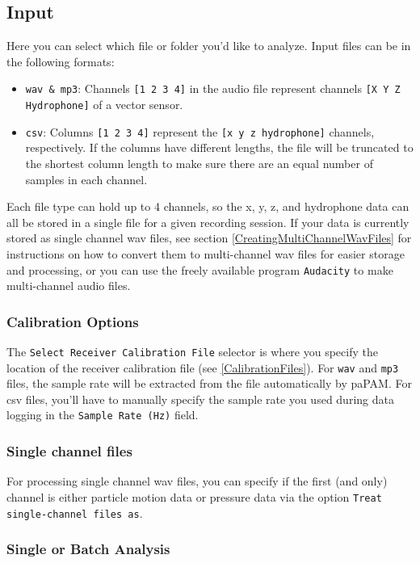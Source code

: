 \documentclass[11pt]{report}
\begin{document}
\subsection{Input}
Here you can select which file or folder you'd like to analyze.  Input files can be in the following formats:

\begin{itemize}
\item \texttt{wav \& mp3}: Channels \texttt{[1 2 3 4]} in the audio file represent channels \texttt{[X Y Z Hydrophone]} of a vector sensor.

\item \texttt{csv}: Columns \texttt{[1 2 3 4]} represent the \texttt{[x y z hydrophone]} channels, respectively.  If the columns have different lengths, the file will be truncated to the shortest column length to make sure there are an equal number of samples in each channel.
\end{itemize}

Each file type can hold up to 4 channels, so the x, y, z, and hydrophone data can all be stored in a single file for a given recording session.  If your data is currently stored as single channel wav files, see section \ref{CreatingMultiChannelWavFiles} for instructions on how to convert them to multi-channel wav files for easier storage and processing, or you can use the freely available program \texttt{Audacity} to make multi-channel audio files.

\subsubsection{Calibration Options}
The \texttt{Select Receiver Calibration File} selector is where you specify the location of the receiver calibration file (see \ref{CalibrationFiles}). For \texttt{wav} and \texttt{mp3} files, the sample rate will be extracted from the file automatically by paPAM. For csv files, you'll have to manually specify the sample rate you used during data logging in the \texttt{Sample Rate (Hz)} field.

\subsubsection{Single channel files}
For processing single channel wav files, you can specify if the first (and only) channel is either particle motion data or pressure data via the option \texttt{Treat single-channel files as}.

\subsubsection{Single or Batch Analysis}
\end{document}

